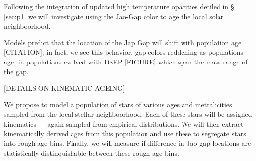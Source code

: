 Following the integration of updated high temperature opacities detiled in \S
\ref{sec:p1} we will investigate using the Jao-Gap color to age the local
solar neighboorhood.

Models predict that the location of the Jap Gap will shift with population age
[CITATION]; in fact, we see this behavior, gap colors reddening as populations
age, in populations evolved with DSEP [FIGURE] which span the mass range of the
gap.

[DETAILS ON KINEMATIC AGEING]

We propose to model a population of stars of various ages and mettalicities
sampled from the local stellar neighboorhood. Each of these stars will be
assigned kinematics --- again sampled from empirical distributions. We will
then extract kinematically derived ages from this population and use these to
segregate stars into rough age bins. Finally, we will measure if difference in
Jao gap locations are statistically distinquishable between these rough age bins.
